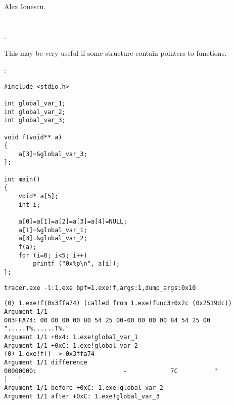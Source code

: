 \documentclass[11pt,a4paper,oneside]{book}
\begin{document}
Alex Ionescu.

\mainmatter













\chapter{}

.

{This may be very useful if some structure contain pointers to functions}.

:

\begin{lstlisting}
#include <stdio.h>

int global_var_1;
int global_var_2;
int global_var_3;

void f(void** a)
{
	a[3]=&global_var_3;
};

int main()
{
	void* a[5];
	int i;

	a[0]=a[1]=a[2]=a[3]=a[4]=NULL;
	a[1]=&global_var_1;
	a[3]=&global_var_2;
	f(a);
	for (i=0; i<5; i++)
		printf ("0x%p\n", a[i]);
};
\end{lstlisting}

\begin{lstlisting}
tracer.exe -l:1.exe bpf=1.exe!f,args:1,dump_args:0x10
\end{lstlisting}

\begin{lstlisting}
(0) 1.exe!f(0x3ffa74) (called from 1.exe!func3+0x2c (0x2519dc))
Argument 1/1 
003FFA74: 00 00 00 00 80 54 25 00-00 00 00 00 84 54 25 00 ".....T%......T%."
Argument 1/1 +0x4: 1.exe!global_var_1
Argument 1/1 +0xC: 1.exe!global_var_2
(0) 1.exe!f() -> 0x3ffa74
Argument 1/1 difference
00000000:                        -            7C          "            |   "
Argument 1/1 before +0xC: 1.exe!global_var_2
Argument 1/1 after +0xC: 1.exe!global_var_3
\end{lstlisting}
\end{document}

